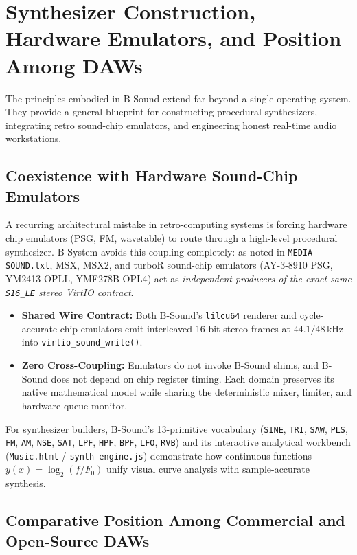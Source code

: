 \chapter{Synthesizer Construction, Hardware Emulators, and Position Among DAWs}
\label{ch:emulators}

The principles embodied in B-Sound extend far beyond a single operating system. They provide a general blueprint for constructing procedural synthesizers, integrating retro sound-chip emulators, and engineering honest real-time audio workstations.

\section{Coexistence with Hardware Sound-Chip Emulators}

A recurring architectural mistake in retro-computing systems is forcing hardware chip emulators (PSG, FM, wavetable) to route through a high-level procedural synthesizer. B-System avoids this coupling completely: as noted in \texttt{MEDIA-SOUND.txt}, MSX, MSX2, and turboR sound-chip emulators (AY-3-8910 PSG, YM2413 OPLL, YMF278B OPL4) act as \emph{independent producers of the exact same \texttt{S16\_LE} stereo VirtIO contract}.

\begin{itemize}[leftmargin=1.5em]
  \item \textbf{Shared Wire Contract:} Both B-Sound's \texttt{lilcu64} renderer and cycle-accurate chip emulators emit interleaved 16-bit stereo frames at $44.1 / 48\,\text{kHz}$ into \texttt{virtio\_sound\_write()}.
  \item \textbf{Zero Cross-Coupling:} Emulators do not invoke B-Sound shims, and B-Sound does not depend on chip register timing. Each domain preserves its native mathematical model while sharing the deterministic mixer, limiter, and hardware queue monitor.
\end{itemize}

For synthesizer builders, B-Sound's 13-primitive vocabulary (\texttt{SINE}, \texttt{TRI}, \texttt{SAW}, \texttt{PLS}, \texttt{FM}, \texttt{AM}, \texttt{NSE}, \texttt{SAT}, \texttt{LPF}, \texttt{HPF}, \texttt{BPF}, \texttt{LFO}, \texttt{RVB}) and its interactive analytical workbench (\texttt{Music.html} / \texttt{synth-engine.js}) demonstrate how continuous functions $y(x) = \log_2(f/F_0)$ unify visual curve analysis with sample-accurate synthesis.

\section{Comparative Position Among Commercial and Open-Source DAWs}

